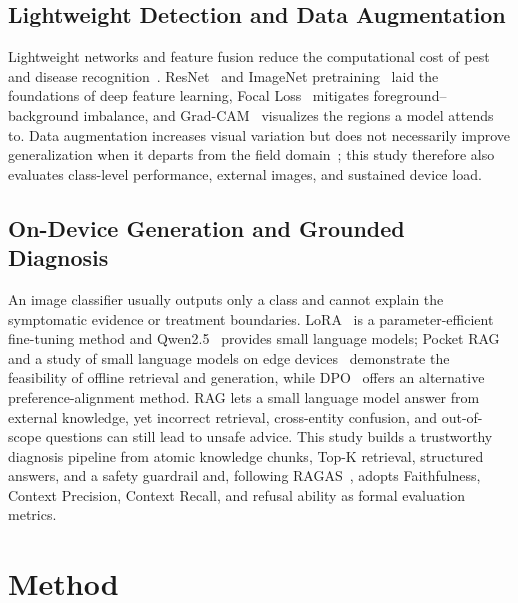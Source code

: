 \documentclass[10pt,twocolumn,a4paper]{article}
\begin{document}
\subsection{Lightweight Detection and Data Augmentation}
Lightweight networks and feature fusion reduce the computational cost of pest and disease recognition~\cite{guan2023,xiong2024,ashurov2025,xu2023,goyal2025,feng2025}. ResNet~\cite{he2016} and ImageNet pretraining~\cite{deng2009} laid the foundations of deep feature learning, Focal Loss~\cite{lin2017} mitigates foreground–background imbalance, and Grad-CAM~\cite{selvaraju2017} visualizes the regions a model attends to. Data augmentation increases visual variation but does not necessarily improve generalization when it departs from the field domain~\cite{shorten2019}; this study therefore also evaluates class-level performance, external images, and sustained device load.

\subsection{On-Device Generation and Grounded Diagnosis}
An image classifier usually outputs only a class and cannot explain the symptomatic evidence or treatment boundaries. LoRA~\cite{hu2021} is a parameter-efficient fine-tuning method and Qwen2.5~\cite{qwen2025} provides small language models; Pocket RAG~\cite{kang2026} and a study of small language models on edge devices~\cite{guainazzo2026} demonstrate the feasibility of offline retrieval and generation, while DPO~\cite{rafailov2023} offers an alternative preference-alignment method. RAG lets a small language model answer from external knowledge, yet incorrect retrieval, cross-entity confusion, and out-of-scope questions can still lead to unsafe advice. This study builds a trustworthy diagnosis pipeline from atomic knowledge chunks, Top-K retrieval, structured answers, and a safety guardrail and, following RAGAS~\cite{es2023}, adopts Faithfulness, Context Precision, Context Recall, and refusal ability as formal evaluation metrics.

\section{Method}
\end{document}
